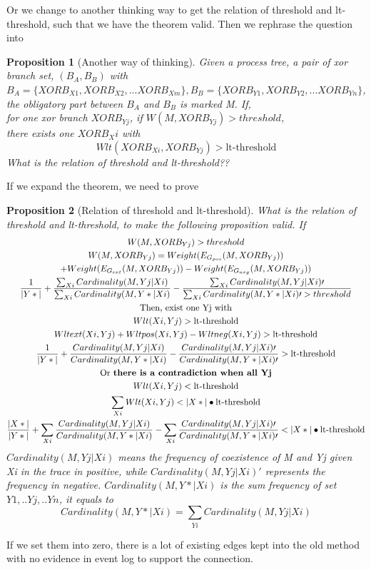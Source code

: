\documentclass[]{article}
\newtheorem{myproposition}{Proposition}[section]
\begin{document}
Or we change to another thinking way to get the relation of threshold and lt-threshold, such that we have the theorem valid. Then we rephrase the question into
\begin{myproposition}[Another way of thinking]
	Given a process tree, a pair of xor branch set, $(B_A,B_B)$ with $B_A=\{XORB_{X1}, XORB_{X2},...XORB_{Xm}\}, B_B=\{XORB_{Y1}, XORB_{Y2},...XORB_{Yn}\}$, the obligatory part between $B_A$ and $B_B$ is marked M. If,\\
	for one xor branch $XORB_{Yj}$, if $W(M, XORB_{Yj}) > threshold$, \\ there exists one $XORB_Xi$ with 
	\[Wlt(XORB_{Xi}, XORB_{Yj})> \text{lt-threshold}\]
	What is the relation of threshold and lt-threshold?? 
\end{myproposition}
If we expand the theorem, we need to prove 
\begin{myproposition}[Relation of threshold and lt-threshold]
	What is the relation of threshold and lt-threshold, to make the following proposition valid. If 
	\begin{equation*}
	\begin{gathered}
	W(M, XORB_{Yj})  > threshold \\
	W(M, XORB_{Yj}) = Weight(E_{G_{pos}}(M, XORB_{Yj})) \\
	+ Weight(E_{G_{ext}}(M, XORB_{Yj})) 
	- Weight(E_{G_{neg}}(M, XORB_{Yj})) \\
	\frac{1}{|Y*|} + \frac{\sum_{Xi}{Cardinality(M,Yj|Xi)}} {\sum_{Xi}{Cardinality(M,Y*|Xi)}}  
	- \frac{\sum_{Xi}{Cardinality(M,Yj|Xi)\prime}} {\sum_{Xi}{Cardinality(M,Y*|Xi)\prime} > threshold} \\
	\text{Then, exist one Yj with}\\
	Wlt(Xi, Yj)> \text{lt-threshold} \\
	Wlt{ext}(Xi, Yj) + Wlt{pos}(Xi, Yj) -Wlt{neg}(Xi, Yj) > \text{lt-threshold}\\
	\frac{1}{|Y*|} + \frac{Cardinality(M,Yj|Xi)} {Cardinality(M,Y*|Xi)}  
	- \frac{Cardinality(M,Yj|Xi)\prime} {Cardinality(M,Y*|Xi)\prime} > \text{lt-threshold}  \\
	\text{Or \textbf{there is a contradiction when all Yj}}\\
	Wlt(Xi, Yj)< \text{lt-threshold}\\
	\sum_{Xi} Wlt(Xi, Yj) < |X*|\bullet \text{lt-threshold} \\
	\frac{|X*|}{|Y*|} + \sum_{Xi}\frac{Cardinality(M,Yj|Xi)} {Cardinality(M,Y*|Xi)}  
	- \sum_{Xi}\frac{Cardinality(M,Yj|Xi)\prime} {Cardinality(M,Y*|Xi)\prime} < |X*|\bullet \text{lt-threshold}  \\
	\end{gathered}
	\end{equation*}	
	$Cardinality(M,Yj|Xi)$ means the frequency of coexistence of M and Yj given Xi in the trace in positive, while $Cardinality(M,Yj|Xi)\prime$ represents the frequency in negative. $Cardinality(M,Y*|Xi)$ is the sum frequency of set ${Y1,..Yj,..Yn}$, it equals to \[Cardinality(M,Y*|Xi) = \sum_{Yi}Cardinality(M,Yj|Xi)\]
\end{myproposition}
If we set them into zero, there is a lot of existing edges kept into the old method with no evidence in event log to support the connection. 
\end{document}
